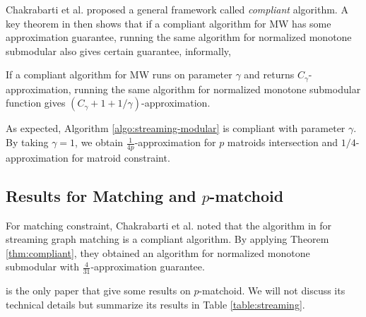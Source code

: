 Chakrabarti et al. \cite{CK14} proposed a general framework called \emph{compliant} algorithm. A key theorem in \cite{CK14} then shows that if a compliant algorithm for MW has some approximation guarantee, running the same algorithm for normalized monotone submodular also gives certain guarantee, informally,
\begin{theorem}
  \label{thm:compliant}
  If a compliant algorithm for MW runs on parameter $\gamma$ and returns $C_{\gamma}$-approximation, running the same algorithm for normalized monotone submodular function gives $(C_{\gamma} + 1 + 1/\gamma)$-approximation.
\end{theorem}

As expected, Algorithm \ref{algo:streaming-modular} is compliant with parameter $\gamma$. By taking $\gamma = 1$, we obtain $\frac{1}{4p}$-approximation for $p$ matroids intersection and $1/4$-approximation for matroid constraint.










\subsection{Results for Matching and $p$-matchoid}
For matching constraint, Chakrabarti et al. \cite{CK14} noted that the algorithm in \cite{Z12} for streaming graph matching is a compliant algorithm. By applying Theorem \ref{thm:compliant}, they obtained an algorithm for normalized monotone submodular with $\frac{4}{31}$-approximation guarantee.

\cite{CGQ15} is the only paper that give some results on $p$-matchoid. We will not discuss its technical details but summarize its results in Table \ref{table:streaming}.